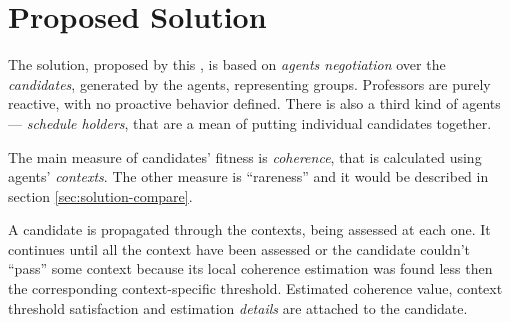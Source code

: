 \documentclass[ThesisDoc]{subfiles}
\begin{document}
\section{Proposed Solution}
\label{sec:solution}


The solution, proposed by this \thisdoc, is based on \emph{agents negotiation}
over the \emph{candidates}, generated by the agents, representing groups.
Professors are purely reactive, with no proactive behavior defined.
There is also a third kind of agents --- \emph{schedule holders}, that are
a mean of putting individual candidates together.

The main measure of candidates' fitness is \emph{coherence}, that is calculated
using agents' \emph{contexts}. The other measure is ``rareness'' and it would be
described in section \ref{sec:solution-compare}.






\medskip{}\medskip

\noindent
A candidate is propagated through the contexts, being assessed at each one.
It continues until all the context have been assessed or the candidate couldn't
``pass'' some context because its local coherence estimation was found less then
the corresponding context-specific threshold. Estimated coherence value,
context threshold satisfaction and estimation \emph{details}
are attached to the candidate.







\end{document}
